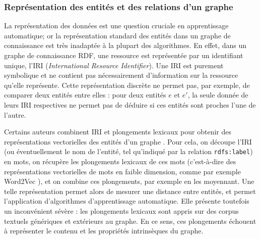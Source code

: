 \subsubsection{Représentation des entités et des relations d'un graphe}
\newcommand{\IRI}{\operatorname{IRI}}
\newcommand{\Adja}{\operatorname{Adj}}

La représentation des données est une question cruciale en apprentissage automatique; or la représentation standard des entités dans un graphe de connaissance est très inadaptée à la plupart des algorithmes. En effet, dans un graphe de connaissance RDF, une ressource est représentée par un identifiant unique, l'IRI (\textit{International Resource Identifier}). 
Une IRI est purement symbolique et ne contient pas nécessairement d'information sur la ressource qu'elle représente. %
Cette représentation discrète ne permet pas, par exemple, de comparer deux entités entre elles : pour deux entités $e$ et $e'$, la seule donnée de leurs IRI respectives ne permet pas de déduire si ces entités sont proches l'une de l'autre. %

Certains auteurs combinent IRI et plongements lexicaux pour obtenir des représentations vectorielles des entités d'un graphe \cite{socher2013reasoning}. Pour cela, on découpe l'IRI (ou éventuellement le nom de l'entité, tel qu'indiqué par la relation \texttt{rdfs:label}) en mots, on récupère les plongements lexicaux de ces mots (c'est-à-dire des représentations vectorielles de mots en faible dimension, comme par exemple Word2Vec \cite{mikolov2013distributed}), et on combine ces plongements, par exemple en les moyennant.
Une telle représentation permet alors de mesurer une distance entre entités, et permet l'application d'algorithmes d'apprentissage automatique. Elle présente toutefois un inconvénient sévère : les plongements lexicaux sont appris sur des corpus textuels génériques et extérieurs au graphe. En ce sens, ces plongements échouent à représenter le contenu et les propriétés intrinsèques du graphe. 


